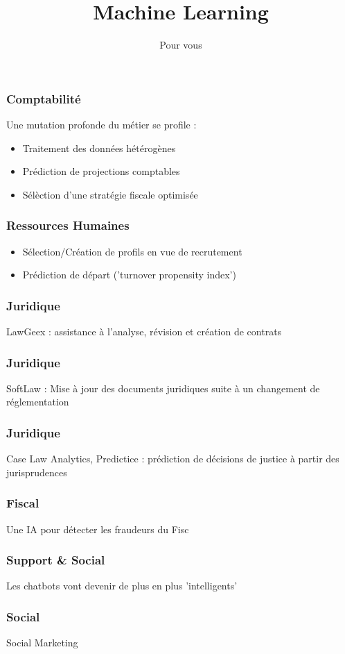 \documentclass{formation}
\title{Machine Learning}
\subtitle{Pour vous}
\begin{document}
\maketitle

\begin{frame}
  \frametitle{Comptabilité}
  Une mutation profonde du métier se profile :
  \begin{itemize}
  \item Traitement des données hétérogènes
  \item Prédiction de projections comptables
  \item Sélèction d'une stratégie fiscale optimisée
  \end{itemize}
\end{frame}

\begin{frame}
  \frametitle{Ressources Humaines}
  \begin{itemize}
  \item Sélection/Création de profils en vue de recrutement
  \item Prédiction de départ ('turnover propensity index')
  \end{itemize}
\end{frame}

\begin{frame}
  \frametitle{Juridique}
  LawGeex : assistance à l'analyse, révision et création de contrats
\end{frame}

\begin{frame}
  \frametitle{Juridique}
  SoftLaw : Mise à jour des documents juridiques suite à un changement de réglementation
\end{frame}

\begin{frame}
  \frametitle{Juridique}
  Case Law Analytics, Predictice : prédiction de décisions de justice à partir des jurisprudences
\end{frame}

\begin{frame}
  \frametitle{Fiscal}
  Une IA pour détecter les fraudeurs du Fisc
\end{frame}

\begin{frame}
  \frametitle{Support \& Social}
  Les chatbots vont devenir de plus en plus 'intelligents'
\end{frame}

\begin{frame}
  \frametitle{Social}
  Social Marketing
\end{frame}
\end{document}
